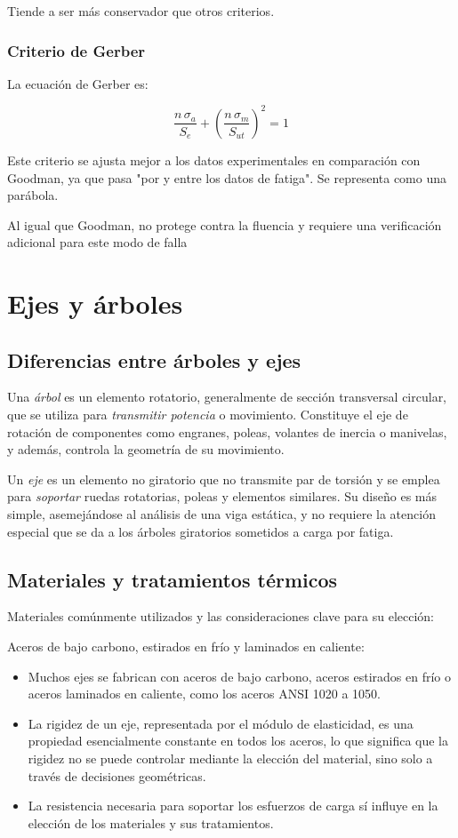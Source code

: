\documentclass[spanish,11pt,a4paper]{article}
\begin{document}
	
	Tiende a ser más conservador que otros criterios.
	\subsubsection{Criterio de Gerber}
	La ecuación de Gerber es: 
	\begin{tcolorbox}
	$$\dfrac{n\,\sigma_a}{S_e} + \left(\dfrac{n\,\sigma_m}{S_{ut}}\right)^2 = 1$$
	\end{tcolorbox}
	
	Este criterio se ajusta mejor a los datos experimentales en comparación con Goodman, ya que pasa "por y entre los datos de fatiga". Se representa como una parábola.
	
	
	Al igual que Goodman, no protege contra la fluencia y requiere una verificación adicional para este modo de falla
	
	\section{Ejes y árboles}
	\subsection{Diferencias entre árboles y ejes}
	Una \emph{árbol} es un elemento rotatorio, generalmente de sección transversal circular, que se utiliza para \emph{transmitir potencia} o movimiento. Constituye el eje de rotación de componentes como engranes, poleas, volantes de inercia o manivelas, y además, controla la geometría de su movimiento.
	
	
	
	Un \emph{eje} es un elemento no giratorio que no transmite par de torsión y se emplea para \emph{soportar} ruedas rotatorias, poleas y elementos similares. Su diseño es más simple, asemejándose al análisis de una viga estática, y no requiere la atención especial que se da a los árboles giratorios sometidos a carga por fatiga.
	
	\subsection{Materiales y tratamientos térmicos}
	
	Materiales comúnmente utilizados y las consideraciones clave para su elección:
	
	Aceros de bajo carbono, estirados en frío y laminados en caliente:
	\begin{itemize}
	\item Muchos ejes se fabrican con aceros de bajo carbono, aceros estirados en frío o aceros laminados en caliente, como los aceros ANSI 1020 a 1050.
	\item La rigidez de un eje, representada por el módulo de elasticidad, es una propiedad esencialmente constante en todos los aceros, lo que significa que la rigidez no se puede controlar mediante la elección del material, sino solo a través de decisiones geométricas.
	\item La resistencia necesaria para soportar los esfuerzos de carga sí influye en la elección de los materiales y sus tratamientos.
	\end{itemize}
	
\end{document}
